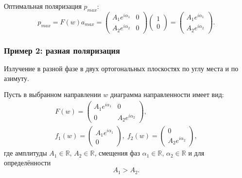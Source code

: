Оптимальная поляризация $p_{max}$:
\[
    p_{max}
    = F(w) a_{max}
    = \begin{pmatrix}
          A_1 e^{i \alpha_1} & 0 \\
          A_2 e^{i \alpha_2} & 0
    \end{pmatrix}
    \begin{pmatrix}
        1 \\
        0
    \end{pmatrix}
    = \begin{pmatrix}
          A_1 e^{i \alpha_1} \\
          A_2 e^{i \alpha_2}
    \end{pmatrix} .
\]

\subsubsection{Пример 2: разная поляризация}

Излучение в разной фазе в двух ортогональных плоскостях по углу места и по азимуту.

Пусть в выбранном направлении $w$ диаграмма направленности имеет вид:
\begin{gather*}
    F(w) = \begin{pmatrix}
               A_1 e^{i \alpha_1} & 0                  \\
               0                  & A_2 e^{i \alpha_2}
    \end{pmatrix} , \\
%
    f_1(w) = \begin{pmatrix}
                 A_1 e^{i \alpha_1} \\
                 0
    \end{pmatrix}
    , \;
    f_2(w) = \begin{pmatrix}
                 0 \\
                 A_2 e^{i \alpha_2}
    \end{pmatrix} ,
\end{gather*}
где амплитуды $A_1 \in \mathbb{R}$, $A_2 \in \mathbb{R}$, смещения фаз $\alpha_1 \in \mathbb{R}$, $\alpha_2 \in \mathbb{R}$ и для определённости
\[
    A_1 > A_2 .
\]

